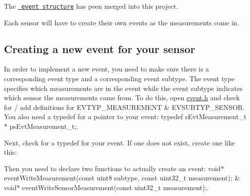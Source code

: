 The \href{https://code.fbi.h-da.de/pse_mayer_ss19/trunk/tree/master/Allgemein/Beispiele/CY8Ckit-149-BLE/I2C_Event.cydsn}{\texttt{ event structure}} has peen merged into this project.

Each sensor will have to create their own events as the measurements come in.

\subsection*{Creating a new event for your sensor}

In order to implement a new event, you need to make sure there is a corresponding event type and a corresponding event subtype. The event type specifies which measurements are in the event while the event subtype indicates which sensor the measurements came from. To do this, open {\ttfamily \mbox{\hyperlink{event_8h_source}{event.\+h}}} and check for / add definitions for {\ttfamily E\+V\+T\+Y\+P\+\_\+\+M\+E\+A\+S\+U\+R\+E\+M\+E\+NT} \& {\ttfamily E\+V\+S\+U\+B\+T\+Y\+P\+\_\+\+S\+E\+N\+S\+OR}. You also need a {\ttfamily typedef} for a pointer to your event\+: {\ttfamily typedef s\+Evt\+Measurement\+\_\+t$\ast$ ps\+Evt\+Measurement\+\_\+t;}.

Next, check for a {\ttfamily typedef} for your event. If one does not exist, create one like this\+:


\begin{DoxyCode}{0}
\end{DoxyCode}


Then you need to declare two functions to actually create an event\+: {\ttfamily void$\ast$ event\+Write\+Measurement(const uint8 subtype, const uint32\+\_\+t measurement);} \& {\ttfamily void$\ast$ event\+Write\+Sensor\+Measurement(const uint32\+\_\+t measurement);}.

